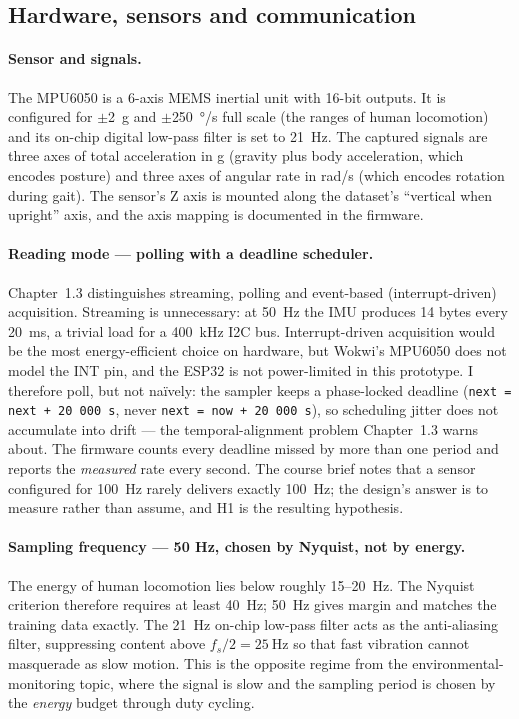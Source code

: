 \documentclass[10pt,a4paper]{article}
\begin{document}
\subsection{Hardware, sensors and communication}

\paragraph{Sensor and signals.} The MPU6050 is a 6-axis MEMS inertial unit with 16-bit outputs. It is configured for $\pm$\SI{2}{g} and $\pm$\SI{250}{\degree/s} full scale (the ranges of human locomotion) and its on-chip digital low-pass filter is set to \SI{21}{\hertz}. The captured signals are three axes of total acceleration in g (gravity plus body acceleration, which encodes posture) and three axes of angular rate in rad/s (which encodes rotation during gait). The sensor's Z axis is mounted along the dataset's ``vertical when upright'' axis, and the axis mapping is documented in the firmware.

\paragraph{Reading mode --- polling with a deadline scheduler.} Chapter~1.3 distinguishes streaming, polling and event-based (interrupt-driven) acquisition. Streaming is unnecessary: at \SI{50}{\hertz} the IMU produces 14 bytes every \SI{20}{ms}, a trivial load for a \SI{400}{kHz} I2C bus. Interrupt-driven acquisition would be the most energy-efficient choice on hardware, but Wokwi's MPU6050 does not model the INT pin, and the ESP32 is not power-limited in this prototype. I therefore poll, but not na\"ively: the sampler keeps a phase-locked deadline (\texttt{next = next + 20\,000\,\textmu s}, never \texttt{next = now + 20\,000\,\textmu s}), so scheduling jitter does not accumulate into drift --- the temporal-alignment problem Chapter~1.3 warns about. The firmware counts every deadline missed by more than one period and reports the \emph{measured} rate every second. The course brief notes that a sensor configured for \SI{100}{\hertz} rarely delivers exactly \SI{100}{\hertz}; the design's answer is to measure rather than assume, and H1 is the resulting hypothesis.

\paragraph{Sampling frequency --- 50 Hz, chosen by Nyquist, not by energy.} The energy of human locomotion lies below roughly 15--\SI{20}{\hertz}. The Nyquist criterion therefore requires at least \SI{40}{\hertz}; \SI{50}{\hertz} gives margin and matches the training data exactly. The \SI{21}{\hertz} on-chip low-pass filter acts as the anti-aliasing filter, suppressing content above $f_s/2 = \SI{25}{\hertz}$ so that fast vibration cannot masquerade as slow motion. This is the opposite regime from the environmental-monitoring topic, where the signal is slow and the sampling period is chosen by the \emph{energy} budget through duty cycling.
\end{document}
